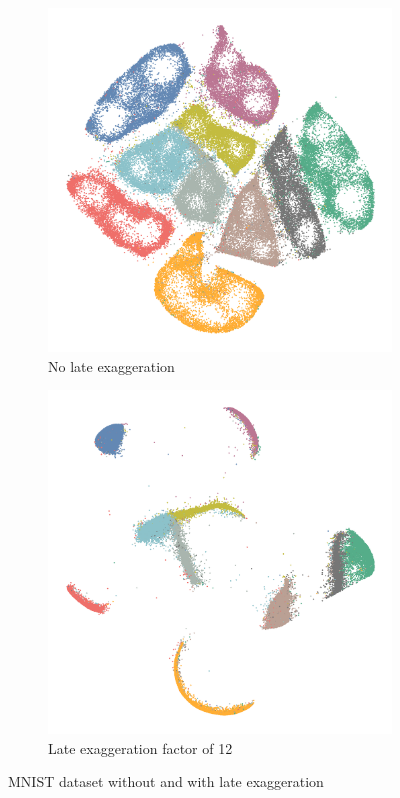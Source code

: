 \begin{figure}[!tbp]
  \begin{subfigure}{.45\linewidth}
    \centering
    \includegraphics[width=\linewidth]{img/mnist_no_late_exagg-1}
    \caption{No late exaggeration}
    \label{fig:mnist-too-small}
  \end{subfigure}
  \begin{subfigure}{.45\linewidth}
    \centering
    \includegraphics[width=\linewidth]{img/mnist_late_exagg-1}
    \caption{Late exaggeration factor of 12}
    \label{fig:mnist-ok}
  \end{subfigure}
  \caption{MNIST dataset without and with late exaggeration}
  \label{fig:exagg-example}
\end{figure}

